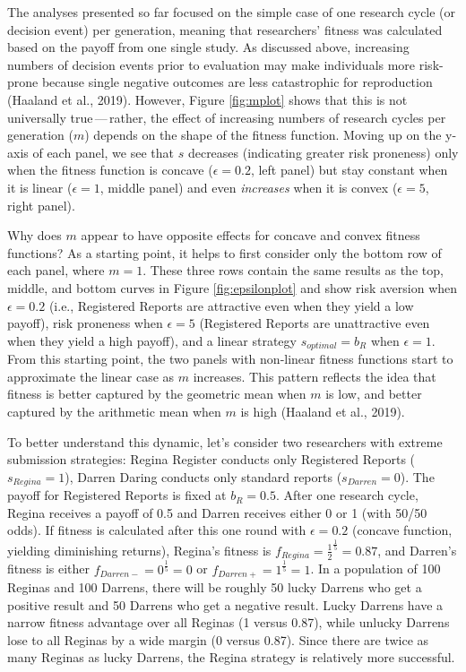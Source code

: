 \documentclass[
  ,man,mask,floatsintext]{apa6}
\begin{document}
The analyses presented so far focused on the simple case of one research cycle (or decision event) per generation, meaning that researchers' fitness was calculated based on the payoff from one single study.
As discussed above, increasing numbers of decision events prior to evaluation may make individuals more risk-prone because single negative outcomes are less catastrophic for reproduction (Haaland et al., 2019).
However, Figure \ref{fig:mplot} shows that this is not universally true\(\,\)---\(\,\)rather, the effect of increasing numbers of research cycles per generation (\(m\)) depends on the shape of the fitness function.
Moving up on the y-axis of each panel, we see that \(s\) decreases (indicating greater risk proneness) only when the fitness function is concave (\(\epsilon = 0.2\), left panel) but stay constant when it is linear (\(\epsilon = 1\), middle panel) and even \emph{increases} when it is convex (\(\epsilon = 5\), right panel).

Why does \(m\) appear to have opposite effects for concave and convex fitness functions?
As a starting point, it helps to first consider only the bottom row of each panel, where \(m = 1\).
These three rows contain the same results as the top, middle, and bottom curves in Figure \ref{fig:epsilonplot} and show risk aversion when \(\epsilon = 0.2\) (i.e., Registered Reports are attractive even when they yield a low payoff), risk proneness when \(\epsilon = 5\) (Registered Reports are unattractive even when they yield a high payoff), and a linear strategy \(s_{optimal} = b_{R}\) when \(\epsilon = 1\).
From this starting point, the two panels with non-linear fitness functions start to approximate the linear case as \(m\) increases.
This pattern reflects the idea that fitness is better captured by the geometric mean when \(m\) is low, and better captured by the arithmetic mean when \(m\) is high (Haaland et al., 2019).

To better understand this dynamic, let's consider two researchers with extreme submission strategies:
Regina Register conducts only Registered Reports (\(s_{Regina} = 1\)), Darren Daring conducts only standard reports (\(s_{Darren} = 0\)).
The payoff for Registered Reports is fixed at \(b_{R} = 0.5\).
After one research cycle, Regina receives a payoff of 0.5 and Darren receives either 0 or 1 (with 50/50 odds).
If fitness is calculated after this one round with \(\epsilon = 0.2\) (concave function, yielding diminishing returns), Regina's fitness is \(f_{Regina} = \frac{1}{2}^{\frac{1}{5}} = 0.87\), and Darren's fitness is either \(f_{Darren-} = 0^{\frac{1}{5}} = 0\) or \(f_{Darren+} = 1^{\frac{1}{5}} = 1\).
In a population of 100 Reginas and 100 Darrens, there will be roughly 50 lucky Darrens who get a positive result and 50 Darrens who get a negative result.
Lucky Darrens have a narrow fitness advantage over all Reginas (1 versus 0.87), while unlucky Darrens lose to all Reginas by a wide margin (0 versus 0.87).
Since there are twice as many Reginas as lucky Darrens, the Regina strategy is relatively more successful.
\end{document}
